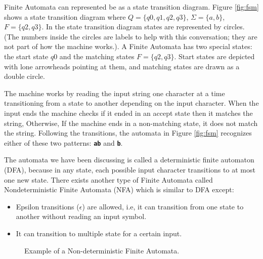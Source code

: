 Finite Automata can represented be as a state transition diagram. Figure \ref{fig:fsm} shows a state transition diagram where $Q = \{q0, q1, q2, q3\}$, $\Sigma = \{a, b\}$, $F = \{q2, q3\}$. In the state transition diagram states are represented by circles. (The numbers inside the circles are labels to help with this conversation; they are not part of how the machine works.). A Finite Automata has two special states: the start state $q0$ and the matching states $F = \{q2, q3\}$. Start states are depicted with lone arrowheads pointing at them, and matching states are drawn as a double circle.

The machine works by reading the input string one character at a time transitioning from a state to another depending on the input character. When the input ends the machine checks if it ended in an accept state then it matches the string, Otherwise, If the machine ends in a non-matching state, it does not match the string. Following the transitions, the automata in Figure \ref{fig:fsm} recognizes either of these two patterns: \texttt{\textbf{ab}} and \texttt{\textbf{b}}.

The automata we have been discussing is called a deterministic finite automaton (DFA), because in any state, each possible input character transitions to at most one new state. There exists another type of Finite Automata called Nondeterministic Finite Automata (NFA) which is similar to DFA except:

\begin{itemize}
    \item Epsilon transitions ($\epsilon$) are allowed, i.e, it can transition from one state to another without reading an input symbol.
    \item It can transition to multiple state for a certain input.
\end{itemize}

\begin{figure}[H]
\centering
{}
\caption{Example of a Non-deterministic Finite Automata.}
\label{fig:nfafsm}
\end{figure}


